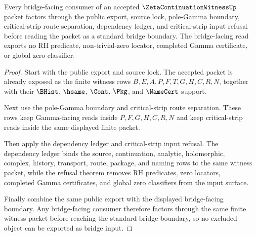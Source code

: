 \begin{theorem}
\label{thm:zetacontinuationwitness-bridged-boundary-mature-route}
Every bridge-facing consumer of an accepted $\ZetaContinuationWitnessUp$ packet factors through the public export, source lock, pole-Gamma boundary, critical-strip route separation, dependency ledger, and critical-strip input refusal before reading the packet as a standard bridge boundary. The bridge-facing read exports no RH predicate, non-trivial-zero locator, completed Gamma certificate, or global zero classifier.
\end{theorem}
\begin{proof}
Start with the public export and source lock. The accepted packet is already exposed as the finite witness rows $B,E,A,P,F,T,G,H,C,R,N$, together with their $\BHist$, $\hsame$, $\Cont$, $\Pkg$, and $\NameCert$ support.

Next use the pole-Gamma boundary and critical-strip route separation. These rows keep Gamma-facing reads inside $P,F,G,H,C,R,N$ and keep critical-strip reads inside the same displayed finite packet.

Then apply the dependency ledger and critical-strip input refusal. The dependency ledger binds the source, continuation, analytic, holomorphic, complex, history, transport, route, package, and naming rows to the same witness packet, while the refusal theorem removes RH predicates, zero locators, completed Gamma certificates, and global zero classifiers from the input surface.

Finally combine the same public export with the displayed bridge-facing boundary. Any bridge-facing consumer therefore factors through the same finite witness packet before reaching the standard bridge boundary, so no excluded object can be exported as bridge input.
\end{proof}

